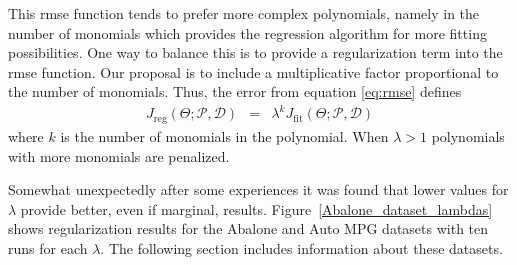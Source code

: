 \documentclass[final,authoryear,3p,times,twocolumn]{elsarticle}
\begin{document}
This \ac{rmse} function tends to prefer more complex polynomials, namely in the number of monomials which provides the regression algorithm for more fitting possibilities. One way to balance this is to provide a regularization term into the \ac{rmse} function. Our proposal is to include a multiplicative factor proportional to the number of monomials. Thus, the error from equation \ref{eq:rmse} defines
\begin{eqnarray}
J_{\textrm{reg}}\left(\Theta;\mathcal{P},\mathcal{D}\right) &=& \lambda^{k} J_{\textrm{fit}}\left(\Theta;\mathcal{P},\mathcal{D}\right)\label{eq:rmse-reg}
\end{eqnarray}
%
where $k$ is the number of monomials in the polynomial. When $\lambda > 1$ polynomials with more monomials are penalized.

Somewhat unexpectedly after some experiences it was found that lower values for $\lambda$ provide better, even if marginal, results. Figure~\ref{Abalone_dataset_lambdas} shows regularization results for the Abalone and Auto MPG datasets with ten runs for each $\lambda$. The following section  includes information about these datasets.
\end{document}
